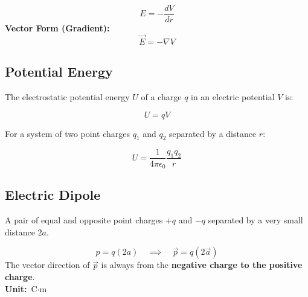 \documentclass[11pt,a4paper]{article}
\begin{document}
\begin{formulabox}
    \[ E = -\frac{dV}{dr} \]
    \textbf{Vector Form (Gradient):}
    \[ \vec{E} = -\nabla V \]
\end{formulabox}

\subsection{Potential Energy}
The electrostatic potential energy $U$ of a charge $q$ in an electric potential $V$ is:
\begin{formulabox}
    \[ U = qV \]
\end{formulabox}

For a system of two point charges $q_1$ and $q_2$ separated by a distance $r$:
\begin{formulabox}
    \[ U = \frac{1}{4\pi\epsilon_0} \frac{q_1 q_2}{r} \]
\end{formulabox}

\subsection{Electric Dipole}
\begin{pyqbox}
    A pair of equal and opposite point charges $+q$ and $-q$ separated by a very small distance $2a$.
\end{pyqbox}

\begin{center}
\end{center}

\begin{formulabox}
    \[ p = q(2a) \quad \implies \quad \vec{p} = q(2\vec{a}) \]
    The vector direction of $\vec{p}$ is always from the \textbf{negative charge to the positive charge}. \\
    \textbf{Unit:} $\text{C}\cdot\text{m}$
\end{formulabox}
\end{document}
